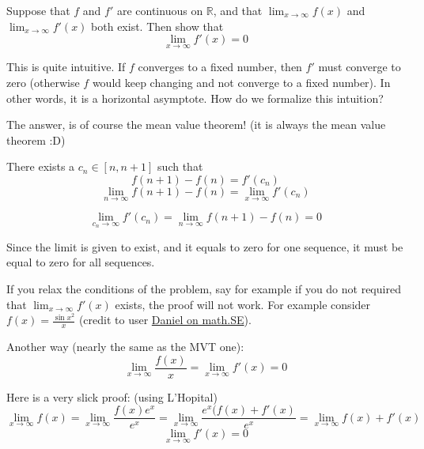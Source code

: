 \documentclass[11]{article}
\title{\sc{Limiting Behavior}}
\author{\sc{Rahul}}
\date{13 March, 2025}
\begin{document}
\maketitle

Suppose that $f$ and $f'$ are continuous on $\mathbb{R}$, and that $\displaystyle\lim_{x\to\infty}f(x)$ and $\displaystyle\lim_{x\to\infty}f'(x)$ both exist. Then show that $$\displaystyle\lim_{x\to\infty}f'(x) = 0$$


This is quite intuitive. If $f$ converges to a fixed number, then $f'$ must converge to zero (otherwise $f$ would keep changing and not converge to a fixed number). In other words, it is a horizontal asymptote. How do we formalize this intuition?

The answer, is of course the mean value theorem! (it is always the mean value theorem :D)

There exists a $c_n \in [n, n+1]$ such that
$$f(n+1) - f(n) = f'(c_n)$$
$$\lim_{n\to\infty} f(n+1) - f(n)= \lim_{x\to\infty} f'(c_n)$$

$$\lim_{c_n\to\infty} f'(c_n) = \lim_{n\to\infty} f(n+1) - f(n) = 0$$

Since the limit is given to exist, and it equals to zero for one sequence, it must be equal to zero for all sequences.

If you relax the conditions of the problem, say for example if you do not required that $\displaystyle\lim_{x\to\infty}f'(x)$ exists, the proof will not work. For example consider $f(x) = \frac{\sin x^2}{x}$ (credit to user \href{https://math.stackexchange.com/questions/42277/proving-that-lim-limits-x-to-inftyfx-0-when-lim-limits-x-to-inftyf/42298#comment5425701_42277}{Daniel on math.SE}).

Another way (nearly the same as the MVT one):
$$\lim_{x\to\infty}\frac{f(x)}{x} = \lim_{x\to\infty}f'(x) = 0$$

Here is a very slick proof: (using L'Hopital)
$$\lim_{x\to\infty}f(x) = \lim_{x\to\infty}\frac{f(x)e^x}{e^x} = \lim_{x\to\infty}\frac{e^x(f(x) + f'(x)}{e^x} = \lim_{x\to\infty} f(x) + f'(x)$$
$$\lim_{x\to\infty} f'(x) = 0$$
\end{document}
